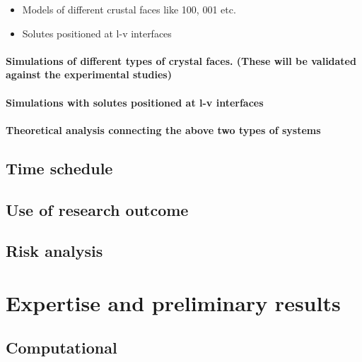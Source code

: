 \documentclass[a4paper,12pt,single,pdftex]{article}
\begin{document}
\begin{itemize}
\label{ID_190203064}\item Models of different crustal faces like 100, 001 etc.
\label{ID_808283525}\item Solutes positioned at l-v interfaces
\end{itemize}
\label{ID_190203064}\label{ID_808283525}\label{ID_1619461814}\paragraph{Simulations of different types of crystal faces. (These will be validated against the experimental studies)}

\label{ID_1547495769}\paragraph{Simulations with solutes positioned at l-v interfaces}

\label{ID_1538917616}\paragraph{Theoretical analysis connecting the above two types of systems}

\label{ID_581300306}\subsection{Time schedule}

\label{ID_1195711759}\subsection{Use of research outcome}

\label{ID_1268337594}\subsection{Risk analysis}

\label{ID_392987275}\subsection{}

\label{ID_3125732}\section{Expertise and preliminary results}

\label{ID_1455861183}\subsection{Computational}
\end{document}

